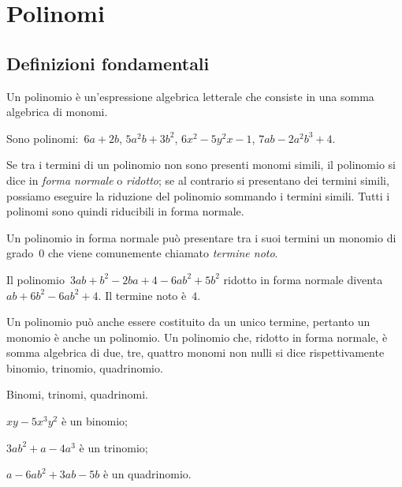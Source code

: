 \section{Polinomi}

\subsection{Definizioni fondamentali}
\label{subsec:10_poli_definizioni}

\begin{definizione}
Un polinomio è un'espressione algebrica letterale che consiste in una somma algebrica di monomi.
\end{definizione}

\begin{exrig}
\begin{esempio}
Sono polinomi:~$6a+2b$, $5a^2b+3b^2$, $6x^2-5y^2x-1$, $7ab-2a^2b^3+4$.
\end{esempio}
\end{exrig}

Se tra i termini di un polinomio non sono presenti monomi simili, il polinomio si dice in \emph{forma normale} o
\emph{ridotto}; se al contrario si presentano dei termini simili, possiamo eseguire la riduzione del polinomio
sommando i termini simili. Tutti i polinomi sono quindi riducibili in forma normale.

Un polinomio in forma normale può presentare tra i suoi termini un monomio di grado~0 che viene
comunemente chiamato \emph{termine noto}.

\begin{exrig}
\begin{esempio}
Il polinomio~$3ab+b^2-2ba+4-6ab^2+5b^2$ ridotto in forma normale diventa~$ab+6b^2-6ab^2+4$. Il termine noto è~$4$.
\end{esempio}
\end{exrig}


Un polinomio può anche essere costituito da un unico termine, pertanto un monomio è anche un polinomio.
Un polinomio che, ridotto in forma normale, è somma algebrica di due, tre, quattro monomi non nulli si dice
rispettivamente binomio, trinomio, quadrinomio.

\begin{exrig}
\begin{esempio}
Binomi, trinomi, quadrinomi.
\begin{enumeratea}
\item $xy-5x^3y^2$ è un binomio;
\item $3ab^2 +a-4a^3$ è un trinomio;
\item $a-6ab^2+3ab-5b$ è un quadrinomio.
\end{enumeratea}
\end{esempio}
\end{exrig}

